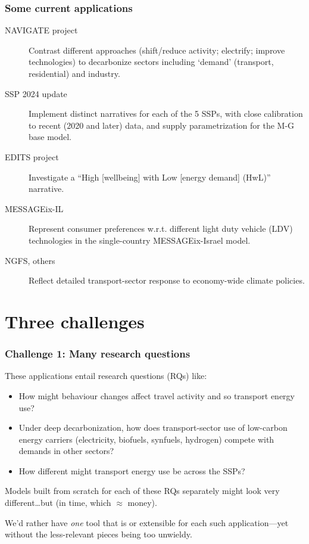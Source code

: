 \documentclass[12pt,aspectratio=169]{beamer}
\begin{document}
\begin{frame}
\frametitle{Some current applications}
\begin{description}
  \item [NAVIGATE project] Contrast different approaches (shift/reduce activity; electrify; improve technologies) to decarbonize sectors including ‘demand’ (transport, residential) and industry.
  \item [SSP 2024 update] Implement distinct narratives for each of the 5 SSPs, with close calibration to recent (2020 and later) data, and supply parametrization for the M-G base model.
  \item [EDITS project] Investigate a “High [wellbeing] with Low [energy demand] (HwL)” narrative.
  \item [MESSAGEix-IL] Represent consumer preferences w.r.t. different light duty vehicle (LDV) technologies in the single-country MESSAGEix-Israel model.
  \item [NGFS, others] Reflect detailed transport-sector response to economy-wide climate policies.
\end{description}

\end{frame}

\section{Three challenges}

\begin{frame}
\frametitle{Challenge 1: Many research questions}
These applications entail research questions (RQs) like:
\begin{itemize}
  \item How might behaviour changes affect travel activity and so transport energy use?
  \item Under deep decarbonization, how does transport-sector use of low-carbon energy carriers (electricity, biofuels, synfuels, hydrogen) compete with demands in other sectors?
  \item How different might transport energy use be across the SSPs?
\end{itemize}

\bigskip
Models built from scratch for each of these RQs separately might look very different…but  (in time, which $\approx$ money).

\bigskip
We'd rather have \emph{one} tool that is  or extensible for each such application—yet without the less-relevant pieces being too unwieldy.
\end{frame}
\end{document}
